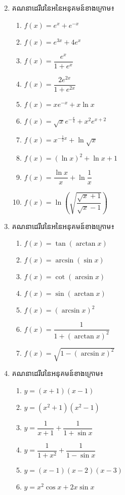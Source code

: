 \documentclass[a4paper,12pt]{article}
\begin{document}
\begin{enumerate}
\begin{multicols}{2}
\begin{enumerate}
\end{enumerate}
\end{multicols}
\item គណនាដេរីវេនៃអនៃអនុគមន៍ខាងក្រោម៖
\begin{multicols}{2}
\begin{enumerate}
\item $f(x)=e^x+e^{-x}$
\item $f(x)=e^{3x} +4e^x$
\item $f(x)=\dfrac{e^x}{1+e^x}$
\item $f(x)=\dfrac{2e^{2x}}{1+e^{2x}}$
\item $f(x)=xe^{-x}+x\ln x$
\item $f(x)=\sqrt{x}e^{-\frac{x}{4}}+x^2e^{x+2}$
\item $f(x)=x^{-\frac{1}{2}x}+\ln \sqrt{x}$
\item $f(x)=(\ln x)^2+\ln x+1$
\item $f(x)=\dfrac{\ln x}{x}+\ln \dfrac{1}{x}$
\item $f(x)=\ln \left( \sqrt{\dfrac{\sqrt{x}+1}{\sqrt{x}-1}}\right)$
\end{enumerate}
\end{multicols}
\item គណនាដេរីវេនៃអនៃអនុគមន៍ខាងក្រោម៖
\begin{multicols}{2}
\begin{enumerate}
\item $f(x)=\tan (\arctan x)$
\item $f(x)=\arcsin (\sin x)$
\item $f(x)=\cot (\arcsin x)$
\item $f(x)=\sin (\arctan x)$
\item $f(x)=(\arcsin x)^2$
\item $f(x)=\dfrac{1}{1+(\arctan x)^2}$
\item $f(x)= \sqrt{1-(\arcsin x)^2}$
\end{enumerate}
\end{multicols}
\item គណនាដេរីវេនៃអនុគមន៍ខាងក្រោម៖
\begin{multicols}{2}
\begin{enumerate}
\item $y=(x+1)(x-1)$
\item $y=(x^2+1)(x^2-1)$
\item $y=\dfrac{1}{x+1}+\dfrac{1}{1+\sin x}$
\item $y=\dfrac{1}{1+x^2}+\dfrac{1}{1-\sin x}$
\item $y=(x-1)(x-2)(x-3)$
\item $y=x^2\cos x+2x\sin x$

\end{enumerate}
\end{multicols}
\end{enumerate}
\end{document}
